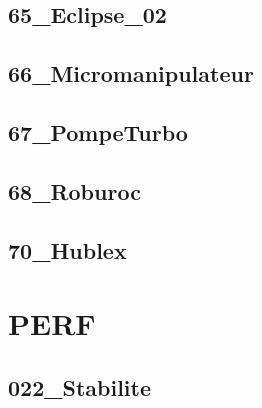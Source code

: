 \subsection{65\_Eclipse\_02}
\graphicspath{{../06-Correction des Systèmes asservis/TD/COR/PI/65_Eclipse_02/images/}{../06-Correction des Systèmes asservis/TD/COR/PI/65_Eclipse_02/}{../Style/png/}}


\subsection{66\_Micromanipulateur}
\graphicspath{{../06-Correction des Systèmes asservis/TD/COR/PI/66_Micromanipulateur/images/}{../06-Correction des Systèmes asservis/TD/COR/PI/66_Micromanipulateur/}{../Style/png/}}


\subsection{67\_PompeTurbo}
\graphicspath{{../06-Correction des Systèmes asservis/TD/COR/PI/67_PompeTurbo/images/}{../06-Correction des Systèmes asservis/TD/COR/PI/67_PompeTurbo/}{../Style/png/}}


\subsection{68\_Roburoc}
\graphicspath{{../06-Correction des Systèmes asservis/TD/COR/PI/68_Roburoc/images/}{../06-Correction des Systèmes asservis/TD/COR/PI/68_Roburoc/}{../Style/png/}}


\subsection{70\_Hublex}
\graphicspath{{../06-Correction des Systèmes asservis/TD/COR/PI/70_Hublex/images/}{../06-Correction des Systèmes asservis/TD/COR/PI/70_Hublex/}{../Style/png/}}


\section{PERF}

\subsection{022\_Stabilite}
\graphicspath{{../06-Correction des Systèmes asservis/TD/PERF/Marges/022_Stabilite/images/}{../06-Correction des Systèmes asservis/TD/PERF/Marges/022_Stabilite/}{../Style/png/}}


